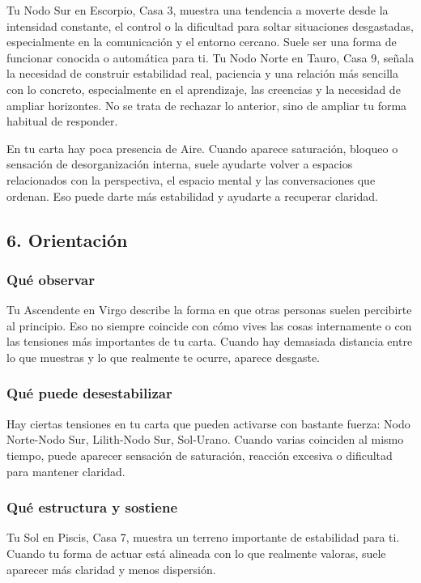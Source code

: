 \documentclass[11pt,a4paper]{article}\usepackage[utf8]{inputenc}
\begin{document}
\vspace{0.3cm}
Tu Nodo Sur en Escorpio, Casa 3, muestra una tendencia a moverte desde la intensidad constante, el control o la dificultad para soltar situaciones desgastadas, especialmente en la comunicación y el entorno cercano. Suele ser una forma de funcionar conocida o automática para ti. Tu Nodo Norte en Tauro, Casa 9, señala la necesidad de construir estabilidad real, paciencia y una relación más sencilla con lo concreto, especialmente en el aprendizaje, las creencias y la necesidad de ampliar horizontes. No se trata de rechazar lo anterior, sino de ampliar tu forma habitual de responder.

\vspace{0.3cm}
En tu carta hay poca presencia de Aire. Cuando aparece saturación, bloqueo o sensación de desorganización interna, suele ayudarte volver a espacios relacionados con la perspectiva, el espacio mental y las conversaciones que ordenan. Eso puede darte más estabilidad y ayudarte a recuperar claridad.

\subsection{6. Orientación}

\subsubsection*{Qué observar}
Tu Ascendente en Virgo describe la forma en que otras personas suelen percibirte al principio. Eso no siempre coincide con cómo vives las cosas internamente o con las tensiones más importantes de tu carta. Cuando hay demasiada distancia entre lo que muestras y lo que realmente te ocurre, aparece desgaste.

\subsubsection*{Qué puede desestabilizar}
Hay ciertas tensiones en tu carta que pueden activarse con bastante fuerza: Nodo Norte-Nodo Sur, Lilith-Nodo Sur, Sol-Urano. Cuando varias coinciden al mismo tiempo, puede aparecer sensación de saturación, reacción excesiva o dificultad para mantener claridad.

\subsubsection*{Qué estructura y sostiene}
Tu Sol en Piscis, Casa 7, muestra un terreno importante de estabilidad para ti. Cuando tu forma de actuar está alineada con lo que realmente valoras, suele aparecer más claridad y menos dispersión.
\end{document}

